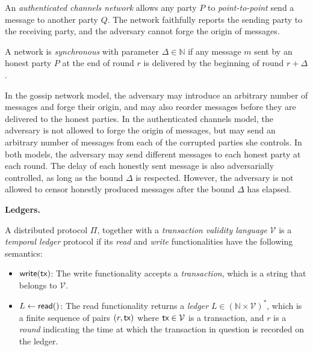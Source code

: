 \begin{definition}
  An \emph{authenticated channels network}
  allows any party $P$ to \emph{point-to-point} send a message to another
  party $Q$. The network faithfully reports the sending party to the receiving
  party, and the adversary cannot forge the origin of messages.
\end{definition}

\begin{definition}[Synchrony]
  A network is \emph{synchronous} with parameter $\Delta \in \mathbb{N}$ if
  any message $m$ sent by an honest party $P$
  at the end of round $r$ is delivered by the beginning of round $r + \Delta$.
\end{definition}

In the gossip network model, the adversary may introduce an arbitrary number of
messages and forge their origin, and may also reorder messages before they are
delivered to the honest parties. In the authenticated channels model, the adversary
is not allowed to forge the origin of messages, but may send an arbitrary number
of messages from each of the corrupted parties she controls.
In both models, the adversary may send different messages
to each honest party at each round. The delay of each honestly sent message is
also adversarially controlled, as long as the bound $\Delta$ is respected.
However, the adversary is not allowed to censor honestly produced messages
after the bound $\Delta$ has elapsed.


\noindent
\textbf{Ledgers.}
\begin{definition}
A distributed protocol $\Pi$, together with a \emph{transaction validity language} $\mathcal{V}$
is a \emph{temporal ledger} protocol if its \emph{read} and \emph{write}
functionalities have the following semantics:

\begin{itemize}
  \item $\textsf{write}(\textsf{tx})$: The write functionality accepts a \emph{transaction}, which is
        a string that belongs to $\mathcal{V}$.
  \item $L \gets \textsf{read}()$: The read functionality returns a \emph{ledger} $L \in (\mathbb{N} \times \mathcal{V})^*$, which is
        a finite sequence of pairs $(r, \textsf{tx})$ where $\textsf{tx} \in \mathcal{V}$ is a transaction, and
        $r$ is a \emph{round} indicating the time at which the transaction in question
        is recorded on the ledger.
\end{itemize}
\end{definition}

